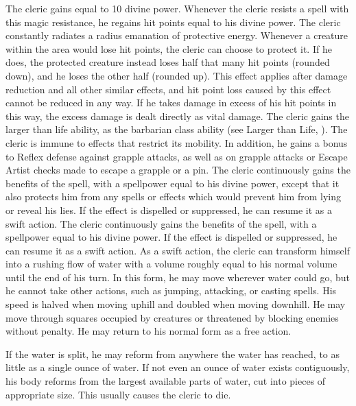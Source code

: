             The cleric gains  equal to 10 \add divine power.
            Whenever the cleric resists a spell with this magic resistance, he regains hit points equal to his divine power.
            The cleric constantly radiates a \areamed radius emanation of protective energy.
            Whenever a creature within the area would lose hit points, the cleric can choose to protect it.
            If he does, the protected creature instead loses half that many hit points (rounded down), and he loses the other half (rounded up).
            This effect applies after damage reduction and all other similar effects, and hit point loss caused by this effect cannot be reduced in any way.
            If he takes damage in excess of his hit points in this way, the excess damage is dealt directly as vital damage.
            The cleric gains the larger than life ability, as the barbarian class ability (see Larger than Life, ).
            The cleric is immune to effects that restrict its mobility. In addition, he gains a  bonus to Reflex defense against grapple attacks, as well as on grapple attacks or Escape Artist checks made to escape a grapple or a pin.
             The cleric continuously gains the benefits of the 
            spell, with a spellpower equal to his divine power, except that it also protects him from any spells or effects which would prevent him from lying or reveal his lies.
            If the effect is dispelled or suppressed, he can resume it as a swift action.
             The cleric continuously gains the benefits of the 
            spell, with a spellpower equal to his divine power.
            If the effect is dispelled or suppressed, he can resume it as a swift action.
            As a swift action, the cleric can transform himself into a rushing flow of water with a volume roughly equal to his normal volume until the end of his turn.
            In this form, he may move wherever water could go, but he cannot take other actions, such as jumping, attacking, or casting spells.
            His speed is halved when moving uphill and doubled when moving downhill.
            He may move through squares occupied by creatures or threatened by blocking enemies without penalty.
            He may return to his normal form as a free action.
            \par If the water is split, he may reform from anywhere the water has reached, to as little as a single ounce of water.
            If not even an ounce of water exists contiguously, his body reforms from the largest available parts of water, cut into pieces of appropriate size.
            This usually causes the cleric to die.

